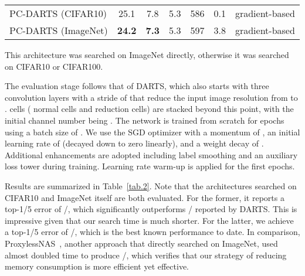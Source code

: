 \documentclass{article} \usepackage{iclr2020_conference,times}
\begin{document}
\begin{table}[t]
\begin{threeparttable}[b]
{\begin{tabular}{@{}lcccccc@{}}
\midrule
PC-DARTS (CIFAR10)                    & 25.1 & 7.8  & 5.3 & 586  & 0.1  & gradient-based \\
PC-DARTS (ImageNet)        & \textbf{24.2} &\textbf{7.3}  & 5.3 & 597  & 3.8 & gradient-based \\
\bottomrule			
\end{tabular}
}
\begin{tablenotes}
\item[] {\footnotesize This architecture was searched on ImageNet directly, otherwise it was searched on CIFAR10 or CIFAR100.}
\end{tablenotes}
\end{threeparttable}
\end{table}

The evaluation stage follows that of DARTS, which also starts with three convolution layers with a stride of  that reduce the input image resolution from  to .  cells ( normal cells and  reduction cells) are stacked beyond this point, with the initial channel number being . The network is trained from scratch for  epochs using a batch size of . We use the SGD optimizer with a momentum of , an initial learning rate of  (decayed down to zero linearly), and a weight decay of . Additional enhancements are adopted including label smoothing and an auxiliary loss tower during training. Learning rate warm-up is applied for the first  epochs.

Results are summarized in Table~\ref{tab.2}. Note that the architectures searched on CIFAR10 and ImageNet itself are both evaluated. For the former, it reports a top-1/5 error of /, which significantly outperforms / reported by DARTS. This is impressive given that our search time is much shorter. For the latter, we achieve a top-1/5 error of /, which is the best known performance to date. In comparison, ProxylessNAS~\citep{cai2018proxylessnas}, another approach that directly searched on ImageNet, used almost doubled time to produce /, which verifies that our strategy of reducing memory consumption is more efficient yet effective.
\end{document}
